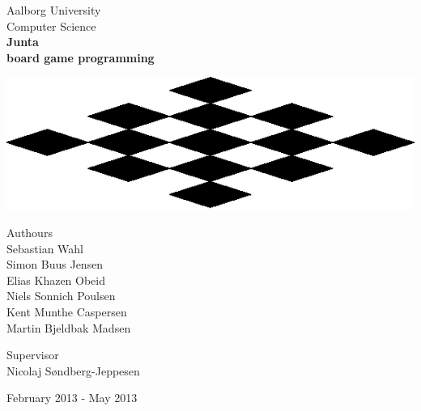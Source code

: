 \begin{titlingpage}
\begin{center}

\vspace*{0.5cm}

\LARGE Aalborg University\\[0.75cm]
\Large Computer Science\\[1.5cm]


{ \fontsize{80.2pt}{80.2pt} \bfseries {} Junta \\}
\vspace{0.15cm}
{ \fontsize{35.2pt}{35.2pt} \bfseries {} board game programming}

\vspace{1.0cm}

\includegraphics[scale=1.5]{pictures/fakelogo}


\begin{minipage}{13.37cm}
  \begin{flushleft} \large
    \vspace{0pt}
    {\small Authours } \\
    \vspace{0.5cm}
    Sebastian Wahl\\
    Simon Buus Jensen\\
    Elias Khazen Obeid\\
    Niels Sonnich Poulsen\\
    Kent Munthe Caspersen\\
    Martin Bjeldbak Madsen\\
  \end{flushleft}

  \begin{flushright} \large
    \vspace{-120pt}
    {\small Supervisor}\\
    \vspace{0.5cm}
    Nicolaj Søndberg-Jeppesen
  \end{flushright}
\end{minipage}

\vfill

{\large February 2013 - May 2013}
\end{center}
\end{titlingpage}
